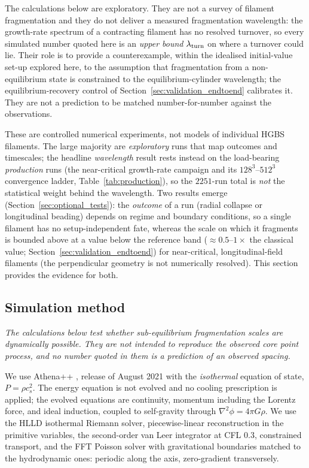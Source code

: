 \documentclass[usenatbib,twoside,twocolumn]{mnras}
\begin{document}
\noindent The calculations below are exploratory. They are not a survey of filament fragmentation and they do not deliver a measured fragmentation wavelength: the growth-rate spectrum of a contracting filament has no resolved turnover, so every simulated number quoted here is an \emph{upper bound} $\lambda_{\rm turn}$ on where a turnover could lie. Their role is to provide a counterexample, within the idealised initial-value set-up explored here, to the assumption that fragmentation from a non-equilibrium state is constrained to the equilibrium-cylinder wavelength; the equilibrium-recovery control of Section~\ref{sec:validation_endtoend} calibrates it. They are not a prediction to be matched number-for-number against the observations.

These are controlled numerical experiments, not models of individual HGBS filaments. The large majority are \emph{exploratory} runs that map outcomes and timescales; the headline \emph{wavelength} result rests instead on the load-bearing \emph{production} runs (the near-critical growth-rate campaign and its $128^3$--$512^3$ convergence ladder, Table~\ref{tab:production}), so the $2251$-run total is \emph{not} the statistical weight behind the wavelength. Two results emerge (Section~\ref{sec:optional_tests}): the \emph{outcome} of a run (radial collapse or longitudinal beading) depends on regime and boundary conditions, so a single filament has no setup-independent fate, whereas the scale on which it fragments is bounded above at a value below the reference band ($\approx0.5$--$1\times$ the classical value; Section~\ref{sec:validation_endtoend}) for near-critical, longitudinal-field filaments (the perpendicular geometry is not numerically resolved). This section provides the evidence for both.

\subsection{Simulation method}
\label{sec:simmethod}

\smallskip\noindent\emph{The calculations below test whether sub-equilibrium fragmentation scales are dynamically possible. They are not intended to reproduce the observed core point process, and no number quoted in them is a prediction of an observed spacing.}

\smallskip We use Athena++ \citep{Stone2020}, release of August 2021 with the \emph{isothermal} equation of state, $P=\rho c_s^2$. The energy equation is not evolved and no cooling prescription is applied; the evolved equations are continuity, momentum including the Lorentz force, and ideal induction, coupled to self-gravity through $\nabla^2\phi=4\pi G\rho$. We use the HLLD isothermal Riemann solver, piecewise-linear reconstruction in the primitive variables, the second-order van Leer integrator at CFL $0.3$, constrained transport, and the FFT Poisson solver with gravitational boundaries matched to the hydrodynamic ones: periodic along the axis, zero-gradient transversely.
\end{document}
